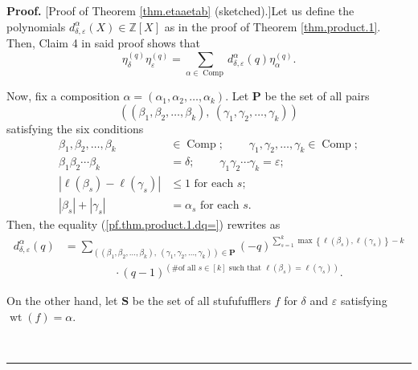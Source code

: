 \documentclass[numbers=enddot,12pt,final,onecolumn,notitlepage]{scrartcl}%
\theoremstyle{definition}
\newenvironment{proof}[1][Proof]{\noindent\textbf{#1.} }{\ \rule{0.5em}{0.5em}}
\let\sumnonlimits\sum
\renewcommand{\sum}{\sumnonlimits\limits}
\begin{document}
\begin{proof}
[Proof of Theorem \ref{thm.etaaetab} (sketched).]Let us define the polynomials
$d_{\delta,\varepsilon}^{\alpha}\left(  X\right)  \in\mathbb{Z}\left[
X\right]  $ as in the proof of Theorem \ref{thm.product.1}. Then, Claim 4 in
said proof shows that%
\begin{equation}
\eta_{\delta}^{\left(  q\right)  }\eta_{\varepsilon}^{\left(  q\right)  }%
=\sum_{\alpha\in\operatorname*{Comp}}d_{\delta,\varepsilon}^{\alpha}\left(
q\right)  \eta_{\alpha}^{\left(  q\right)  }. \label{pf.thm.etaaetab.old}%
\end{equation}


Now, fix a composition $\alpha=\left(  \alpha_{1},\alpha_{2},\ldots,\alpha
_{k}\right)  $. Let $\mathbf{P}$ be the set of all pairs%
\[
\left(  \left(  \beta_{1},\beta_{2},\ldots,\beta_{k}\right)  ,\ \left(
\gamma_{1},\gamma_{2},\ldots,\gamma_{k}\right)  \right)
\]
satisfying the six conditions%
\begin{align*}
\beta_{1},\beta_{2},\ldots,\beta_{k}  &  \in\operatorname*{Comp}%
;\ \ \ \ \ \ \ \ \ \ \gamma_{1},\gamma_{2},\ldots,\gamma_{k}\in
\operatorname*{Comp};\\
\beta_{1}\beta_{2}\cdots\beta_{k}  &  =\delta;\ \ \ \ \ \ \ \ \ \ \gamma
_{1}\gamma_{2}\cdots\gamma_{k}=\varepsilon;\\
\left\vert \ell\left(  \beta_{s}\right)  -\ell\left(  \gamma_{s}\right)
\right\vert  &  \leq1\text{ for each }s;\\
\left\vert \beta_{s}\right\vert +\left\vert \gamma_{s}\right\vert  &
=\alpha_{s}\text{ for each }s.
\end{align*}
Then, the equality (\ref{pf.thm.product.1.dq=}) rewrites as
\begin{align}
d_{\delta,\varepsilon}^{\alpha}\left(  q\right)   &  =\sum_{\left(  \left(
\beta_{1},\beta_{2},\ldots,\beta_{k}\right)  ,\ \left(  \gamma_{1},\gamma
_{2},\ldots,\gamma_{k}\right)  \right)  \in\mathbf{P}}\left(  -q\right)
^{\sum_{s=1}^{k}\max\left\{  \ell\left(  \beta_{s}\right)  ,\ell\left(
\gamma_{s}\right)  \right\}  -k}\nonumber\\
&  \ \ \ \ \ \ \ \ \ \ \ \ \ \ \ \ \ \ \ \ \cdot\left(  q-1\right)  ^{\left(
\text{\# of all }s\in\left[  k\right]  \text{ such that }\ell\left(  \beta
_{s}\right)  =\ell\left(  \gamma_{s}\right)  \right)  }.
\label{pf.thm.etaaetab.dq=}%
\end{align}


On the other hand, let $\mathbf{S}$ be the set of all stufufufflers $f$ for
$\delta$ and $\varepsilon$ satisfying $\operatorname*{wt}\left(  f\right)
=\alpha$.


\end{proof}
\end{document}
